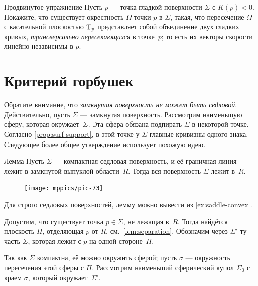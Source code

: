 \begin{thm}{Продвинутое упражнение}\label{ex:crosss}
Пусть $p$ --- точка гладкой поверхности $\Sigma$ с $K(p)<0$.
Покажите, что существует окрестность $\Omega$ точки $p$ в $\Sigma$,
такая, что пересечение $\Omega$ с касательной плоскостью $\mathrm{T}_p$ представляет собой объединение двух гладких кривых, \emph{трансверсально пересекающихся} в точке~$p$;
то есть их векторы скорости линейно независимы в $p$.
\end{thm}



\section{Критерий горбушек}

Обратите внимание, что \textit{замкнутая поверхность не может быть седловой}.
Действительно, пусть $\Sigma$ --- замкнутая поверхность.
Рассмотрим наименьшую сферу, которая окружает~$\Sigma$.
Эта сфера обязана подпирать $\Sigma$ в некоторой точке.
Согласно \ref{prop:surf-support}, в этой точке у $\Sigma$ главные кривизны одного знака.
Следующее более общее утверждение использует похожую идею.

\begin{thm}{Лемма}\label{lem:convex-saddle}
Пусть $\Sigma$ --- компактная седловая поверхность, и её граничная линия лежит в замкнутой выпуклой области~$R$.
Тогда вся поверхность $\Sigma$ лежит в~$R$.
\end{thm}

{

\begin{figure}
\vskip-8mm
\centering
\texttt{[image: mppics/pic-73]}
\vskip-4mm
\end{figure}

Для строго седловых поверхностей, лемму можно вывести из \ref{ex:saddle-convex}.

Допустим, что существует точка $p\in \Sigma$,  не лежащая в~$R$.
Тогда найдётся плоскость $\Pi$, отделяющая $p$ от $R$, см.~\ref{lem:separation}.
Обозначим через $\Sigma'$ ту часть $\Sigma$, которая лежит с $p$ на одной стороне~$\Pi$.

}

Так как $\Sigma$ компактна, её можно окружить сферой;
пусть $\sigma$ --- окружность пересечения этой сферы с $\Pi$.
Рассмотрим наименьший сферический купол $\Sigma_0$ с краем $\sigma$, который окружает~$\Sigma'$.

